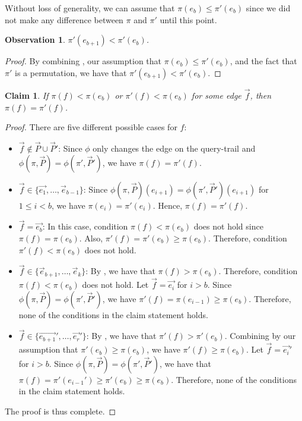\documentclass[letterpaper,11pt]{article}
\newtheorem{claim}[theorem]{Claim}
\newtheorem{observation}[theorem]{Observation}
\newenvironment{myproof}{
\vspace{-0.5cm}
\begin{proof}
}{
\end{proof}
}
\begin{document}
Without loss of generality, we can assume that $\pi(e_b) \leq \pi'(e_b)$ since we did not make any difference between $\pi$ and $\pi'$ until this point.

\begin{observation}\label{obs:branch-begin}
$\pi'(e_{b+1}) < \pi'(e_b)$.
\end{observation}
\begin{myproof}
By combining , our assumption that $\pi(e_b) \leq \pi'(e_b)$, and the fact that $\pi'$ is a permutation, we have that $\pi'(e_{b+1}) < \pi'(e_b)$.
\end{myproof}

\begin{claim}\label{clm:equal-ranks}
If $\pi(f) < \pi(e_b)$ or $\pi'(f) < \pi(e_b)$ for some edge $\vec{f}$, then $\pi(f) = \pi'(f)$.
\end{claim}
\begin{myproof}
There are five different possible cases for $f$:
\begin{itemize}
    \item $\vec{f} \notin \vec{P} \cup \vec{P}'$: Since $\phi$ only changes the edge on the query-trail and $\phi(\pi, \vec{P})=\phi(\pi', \vec{P}')$, we have $\pi(f) = \pi'(f)$. 
    \item $\vec{f} \in \{\vec{e_1}, \ldots, \vec{e}_{b-1}\}$: Since $\phi(\pi, \vec{P})(e_{i+1}) = \phi(\pi', \vec{P}')(e_{i+1})$ for $1 \leq i < b$, we have $\pi(e_i) = \pi'(e_i)$. Hence, $\pi(f) = \pi'(f)$.
    \item $\vec{f}=\vec{e_b}$: In this case, condition $\pi(f) < \pi(e_b)$ does not hold since $\pi(f) = \pi(e_b)$. Also, $\pi'(f)=\pi'(e_b) \geq \pi(e_b)$. Therefore, condition $\pi'(f) < \pi(e_b)$ does not hold. 
    \item $\vec{f}\in \{\vec{e}_{b+1}, \ldots, \vec{e}_k\}$: By , we have that $\pi(f) > \pi(e_b)$. Therefore, condition $\pi(f) < \pi(e_b)$ does not hold. Let $\vec{f}=\vec{e_i}$ for $i > b$. Since $\phi(\pi, \vec{P}) = \phi(\pi', \vec{P}')$, we have $\pi'(f) = \pi(e_{i-1}) \geq \pi(e_b)$. Therefore, none of the conditions in the claim statement holds.
    \item $\vec{f}\in \{\vec{e_{b+1}}', \ldots, \vec{e_r}'\}$: By , we have that $\pi'(f) > \pi'(e_b)$. Combining by our assumption that $\pi'(e_b) \geq \pi(e_b)$, we have $\pi'(f) \geq \pi(e_b)$. Let $\vec{f}=\vec{e_i}'$ for $i > b$. Since $\phi(\pi, \vec{P}) = \phi(\pi', \vec{P}')$, we have that $\pi(f) = \pi'(e_{i-1}') \geq \pi'(e_b) \geq \pi(e_b)$. Therefore, none of the conditions in the claim statement holds.
\end{itemize}
The proof is thus complete.
\end{myproof}
\end{document}
